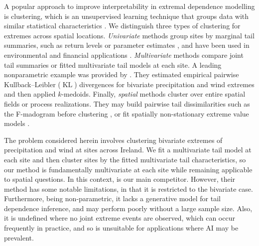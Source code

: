 \documentclass[
  12pt]{article}
\DeclareMathOperator{\KL}{\mathrm{KL}}
\begin{document}
A popular approach to improve interpretability in extremal dependence modelling is clustering, which is an unsupervised learning technique that groups data with similar statistical characteristics \citep{Hastie2009}.
We distinguish three types of clustering for extremes across spatial locations. 
\emph{Univariate} methods group sites by marginal tail summaries, such as return levels or parameter estimates \citep{Coles2001}, and have been used in environmental and financial applications \citep{Alonso2014-rr, deCarvalho2023, Zheng2023-jf}.
\emph{Multivariate} methods compare joint tail summaries or fitted multivariate tail models at each site.
A leading nonparametric example was provided by \citet{Vignotto2021}.
They estimated empirical pairwise Kullback--Leibler ($\KL{}$) divergences for bivariate precipitation and wind extremes and then applied $k$-medoids.%
Finally, \emph{spatial} methods cluster over entire spatial fields or process realizations.
They may build pairwise tail dissimilarities such as the F-madogram before clustering \citep{Cooley2006variograms, Bernard2013}, or fit spatially non-stationary extreme value models \citep{Carreau2017, Rohrbeck2021, Dupuis2023}. 

The problem considered herein involves clustering bivariate extremes of precipitation and wind at sites across Ireland.
We fit a multivariate tail model at each site and then cluster sites by the fitted multivariate tail characteristics, so our method is fundamentally multivariate at each site while remaining applicable to spatial questions.
In this context, \citet{Vignotto2021} is our main competitor.
However, their method has some notable limitations, in that it is restricted to the bivariate case.
Furthermore, being non-parametric, it lacks a generative model for tail dependence inference, and may perform poorly without a large sample size. 
Also, it is undefined where no joint extreme events are observed, which can occur frequently in practice, and so is unsuitable for applications where AI may be prevalent.
\end{document}
